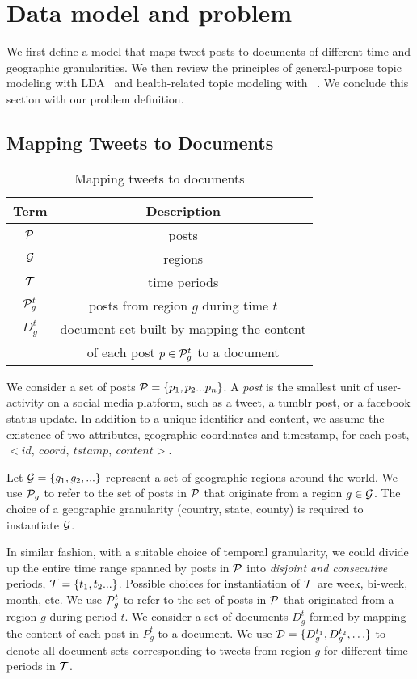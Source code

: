 \section{Data model and problem}
\label{sec:background}
We first define a model that maps tweet posts to documents of
different time and geographic granularities. We then review the
principles of general-purpose topic modeling with LDA~\cite{lda} and
health-related topic modeling with \atam~\cite{atam2}. We conclude this
section with our problem definition.

\subsection{Mapping Tweets to Documents}
\begin{table}[b!]
\centering
\caption{Mapping tweets to documents}
\label{tab:model:terms}
\begin{tabular}{|c|c|}
\hline
{\bf Term} & {\bf Description}\\
\hline
$\mathcal{P}$ & posts\\
\hline
$\mathcal{G}$ & regions\\
\hline
$\mathcal{T}$ & time periods\\
\hline
$\mathcal{P}_g^t$ & posts from region $g$ during time $t$\\
\hline
$D_g^t$ & document-set built by mapping the content\\
& of each post $p\in \mathcal{P}_g^t$ to a document\\
\hline
\end{tabular}
\end{table}

We consider a set of posts $\mathcal{P}=\{p_1,p_2...p_n\}$. A \emph{post} 
is the smallest unit of user-activity on a social media platform, 
such as a tweet, a tumblr post, or a facebook status update. In 
addition to a unique identifier and content, we assume the existence 
of two attributes, geographic coordinates and timestamp, for each
post, $<id,\ coord,\ tstamp,\ content>$.

Let $\mathcal{G}=\{g_1,g_2,...\}$ represent a set of geographic regions 
around the world. We use $\mathcal{P}_g$ to refer to the set of posts 
in $\mathcal{P}$ that originate from a region $g \in \mathcal{G}$. The choice 
of a geographic granularity (country, state, county) is required 
to instantiate $\mathcal{G}$.

In similar fashion, with a suitable choice of temporal granularity, 
we could divide up the entire time range spanned by posts in $\mathcal{P}$ into 
{\em disjoint and consecutive} periods, $\mathcal{T}=\{t_1,t_2...\}$. 
Possible choices for instantiation of $\mathcal{T}$ are week, bi-week, 
month, etc. We use $\mathcal{P}_g^t$ to refer to the set of posts in
$\mathcal{P}$ that originated from a region $g$ during period $t$.
We consider a set of documents $D_g^t$ formed by mapping the content 
of each post in $P_g^t$ to a document. We use 
$\mathcal{D}=\{D_g^{t_1},D_g^{t_2},\ldots\}$ to denote all document-sets 
corresponding to tweets from region $g$ for different time periods in $\mathcal{T}$.

